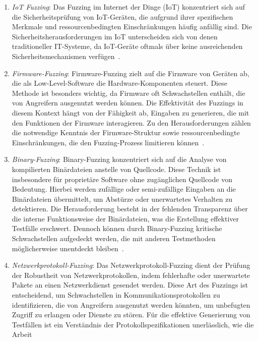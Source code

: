 \begin{enumerate}
    \item \textit{IoT Fuzzing}: Das Fuzzing im Internet der Dinge (IoT) konzentriert sich auf die Sicherheitsprüfung von IoT-Geräten, die aufgrund ihrer
    spezifischen Merkmale und ressourcenbedingten Einschränkungen häufig anfällig sind.
    Die Sicherheitsherausforderungen im IoT unterscheiden sich von denen traditioneller IT-Systeme, da IoT-Geräte
    oftmals über keine ausreichenden Sicherheitsmechanismen verfügen~\cite{eceiza_fuzzing_2021}.
    \item \textit{Firmware-Fuzzing}: Firmware-Fuzzing zielt auf die Firmware von Geräten ab, die als Low-Level-Software die Hardware-Komponenten steuert.
    Diese Methode ist besonders wichtig, da Firmware oft Schwachstellen enthält, die von Angreifern ausgenutzt werden können.
    Die Effektivität des Fuzzings in diesem Kontext hängt von der Fähigkeit ab, Eingaben zu generieren, die mit den Funktionen
    der Firmware interagieren.
    Zu den Herausforderungen zählen die notwendige Kenntnis der Firmware-Struktur sowie ressourcenbedingte Einschränkungen,
    die den Fuzzing-Prozess limitieren können~\cite{eceiza_fuzzing_2021}.
    \item \textit{Binary-Fuzzing}: Binary-Fuzzing konzentriert sich auf die Analyse von kompilierten Binärdateien anstelle von Quellcode.
    Diese Technik ist insbesondere für proprietäre Software ohne zugänglichen Quellcode von Bedeutung.
    Hierbei werden zufällige oder semi-zufällige Eingaben an die Binärdateien übermittelt, um Abstürze oder unerwartetes Verhalten
    zu detektieren.
    Die Herausforderung besteht in der fehlenden Transparenz über die interne Funktionsweise der Binärdateien, was die Erstellung
    effektiver Testfälle erschwert.
    Dennoch können durch Binary-Fuzzing kritische Schwachstellen aufgedeckt werden, die mit anderen Testmethoden möglicherweise
    unentdeckt bleiben~\cite{eceiza_fuzzing_2021}.
    \item \textit{Netzwerkprotokoll-Fuzzing}: Das Netzwerkprotokoll-Fuzzing dient der Prüfung der Robustheit von Netzwerkprotokollen, indem fehlerhafte oder unerwartete
    Pakete an einen Netzwerkdienst gesendet werden.
    Diese Art des Fuzzings ist entscheidend, um Schwachstellen in Kommunikationsprotokollen zu identifizieren, die von
    Angreifern ausgenutzt werden könnten, um unbefugten Zugriff zu erlangen oder Dienste zu stören.
    Für die effektive Generierung von Testfällen ist ein Verständnis der Protokollspezifikationen unerlässlich, wie die Arbeit

\end{enumerate}
